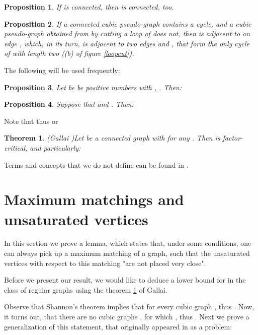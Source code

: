\documentclass[fleqn,12pt,twoside]{article}
\newtheorem{theorem}{Theorem}
\newtheorem{proposition}{Proposition}
\newenvironment{proof}[1][Proof.]{\begin{trivlist}
\item[\hskip \labelsep {\bfseries #1}]}{\end{trivlist}}
\begin{document}
\begin{proposition}
\label{ConnectedInvariance}If  is connected, then  is
connected, too.
\end{proposition}

\begin{proposition}
\label{CycleInvariance}If a connected cubic pseudo-graph 
contains a cycle, and a cubic pseudo-graph  obtained from
 by cutting a loop  of  does not, then  is
adjacent to an edge , which, in its turn, is adjacent to two
edges  and , that form the only cycle of  with length
two ((b) of figure \ref{loopcut}).
\end{proposition}

The following will be used frequently:

\begin{proposition}
\label{FractionInequality}Let be  be positive numbers with , . Then:
\end{proposition}

\begin{proposition}
\label{LinearInequality}Suppose that    and . Then:
\end{proposition}

\begin{proof}
Note that
thus
or
\end{proof}

\begin{theorem}\label{Gallai}(Gallai \cite{Lov})Let  be a connected graph
with  for any . Then  is factor-critical,
and particularly:

\end{theorem}
Terms and concepts that we do not define can be found in
\cite{Harary,Lov,West}.

\section{Maximum matchings and unsaturated vertices}

In this section we prove a lemma, which states that, under some
conditions, one can always pick up a maximum matching of a graph,
such that the unsaturated vertices with respect to this matching
"are not placed very close".

Before we present our result, we would like to deduce a lower bound
for  in the class of regular graphs using the theorem
\ref{Gallai} of Gallai.

Observe that Shannon's theorem implies that  for every cubic graph , thus . Now, it turns out, that there are no cubic
graphs , for which , thus .
Next we
prove a generalization of this statement, that originally appeared in \cite {Monthly} as a problem:
\end{document}
